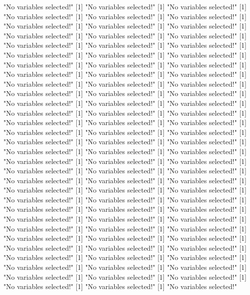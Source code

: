 \documentclass{amsart}
\begin{document}
\begin{Schunk}
\begin{Soutput}
[1] "No variables selected!"
[1] "No variables selected!"
[1] "No variables selected!"
[1] "No variables selected!"
[1] "No variables selected!"
[1] "No variables selected!"
[1] "No variables selected!"
[1] "No variables selected!"
[1] "No variables selected!"
[1] "No variables selected!"
[1] "No variables selected!"
[1] "No variables selected!"
[1] "No variables selected!"
[1] "No variables selected!"
[1] "No variables selected!"
[1] "No variables selected!"
[1] "No variables selected!"
[1] "No variables selected!"
[1] "No variables selected!"
[1] "No variables selected!"
[1] "No variables selected!"
[1] "No variables selected!"
[1] "No variables selected!"
[1] "No variables selected!"
[1] "No variables selected!"
[1] "No variables selected!"
[1] "No variables selected!"
[1] "No variables selected!"
[1] "No variables selected!"
[1] "No variables selected!"
[1] "No variables selected!"
[1] "No variables selected!"
[1] "No variables selected!"
[1] "No variables selected!"
[1] "No variables selected!"
[1] "No variables selected!"
[1] "No variables selected!"
[1] "No variables selected!"
[1] "No variables selected!"
[1] "No variables selected!"
[1] "No variables selected!"
[1] "No variables selected!"
[1] "No variables selected!"
[1] "No variables selected!"
[1] "No variables selected!"
[1] "No variables selected!"
[1] "No variables selected!"
[1] "No variables selected!"
[1] "No variables selected!"
[1] "No variables selected!"
[1] "No variables selected!"
[1] "No variables selected!"
[1] "No variables selected!"
[1] "No variables selected!"
[1] "No variables selected!"
[1] "No variables selected!"
[1] "No variables selected!"
[1] "No variables selected!"
[1] "No variables selected!"
[1] "No variables selected!"
[1] "No variables selected!"
[1] "No variables selected!"
[1] "No variables selected!"
[1] "No variables selected!"
[1] "No variables selected!"
[1] "No variables selected!"
[1] "No variables selected!"
[1] "No variables selected!"
[1] "No variables selected!"
[1] "No variables selected!"
[1] "No variables selected!"
[1] "No variables selected!"
[1] "No variables selected!"
[1] "No variables selected!"
[1] "No variables selected!"
[1] "No variables selected!"
[1] "No variables selected!"
[1] "No variables selected!"
[1] "No variables selected!"
[1] "No variables selected!"
[1] "No variables selected!"
[1] "No variables selected!"
[1] "No variables selected!"
[1] "No variables selected!"
[1] "No variables selected!"
[1] "No variables selected!"
[1] "No variables selected!"
[1] "No variables selected!"
[1] "No variables selected!"
[1] "No variables selected!"
\end{Soutput}
\end{Schunk}
\end{document}
